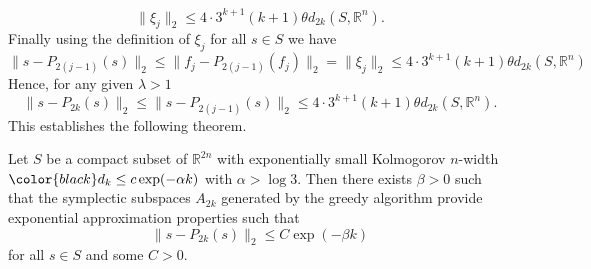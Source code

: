 \documentclass[final]{siamart}
\begin{document}
\begin{equation} \label{eq:new20}
	\| \xi_j \|_2 \leq 4\cdot 3^{k+1} (k+1) \theta d_{2k}(S,\mathbb R^n).
\end{equation}
Finally using the definition of $\xi_j$ for all $s\in S$ we have
\begin{equation} \label{eq:new21}
	\| s - P_{2(j-1)}(s) \|_2 \leq \| f_j - P_{2(j-1)}(f_j) \|_2 = \|\xi_j \|_2 \leq 4\cdot 3^{k+1} (k+1) \theta d_{2k}(S,\mathbb R^n)
\end{equation}
Hence, for any given $\lambda > 1$
\begin{equation} \label{eq:new22}
	\| s - P_{2k}(s) \|_2 \leq \| s - P_{2(j-1)}(s) \|_2 \leq 4\cdot 3^{k+1} (k+1) \theta d_{2k}(S,\mathbb R^n).
\end{equation}
This establishes the following theorem.
\begin{theorem} \label{theorem:SyMo:2}
	Let $S$ be a compact subset of $\mathbb{R}^{2n}$ with exponentially small Kolmogorov $n$-width ${\color{black}} d_{k}\leq c\exp(-\alpha k)$ with $\alpha > \log3$. Then there exists $\beta>0$ such that the symplectic subspaces $A_{2k}$ generated by the greedy algorithm provide exponential approximation properties such that
\begin{equation} \label{eq:new23}
	\| s - P_{2k}(s) \|_2 \leq C \exp(-\beta k)
\end{equation}
for all $s\in S$ and some $C>0$.
\end{theorem}
\end{document}
